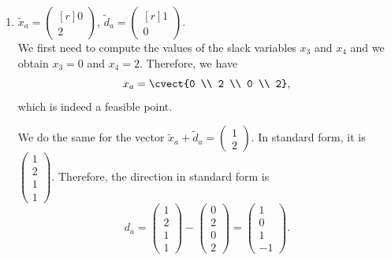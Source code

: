     \begin{enumerate}

        \item $\tilde{x}_a = \begin{pmatrix*}[r] 0 \\ 2 \end{pmatrix*}$, $\tilde{d}_a = \begin{pmatrix*}[r] 1 \\ 0 \end{pmatrix*}.$ \\
        We first need to compute the values of the slack variables
        $x_3$ and $x_4$ and we obtain $x_3 = 0$ and $x_4 =
        2$. Therefore, we have
        \[
       x_a = \cvect{0 \\ 2 \\ 0 \\ 2},
       \]
       which is indeed a feasible point.

       We do the same for the vector $\tilde{x}_a+\tilde{d}_a = \left(\begin{array}{r} 1\\ 2 \end{array}\right)$.
       In standard form, it is $\left(\begin{array}{r} 1\\ 2 \\ 1 \\ 1 \end{array}\right)$.
       Therefore, the direction in standard form is
       \[
       d_a=\left(\begin{array}{r} 1\\ 2 \\ 1 \\ 1 \end{array}\right)-
       \left(\begin{array}{r} 0 \\ 2 \\ 0 \\ 2\end{array}\right) =
       \left(\begin{array}{r} 1\\ 0 \\ 1 \\ -1 \end{array}\right).
        \]



\end{enumerate}

